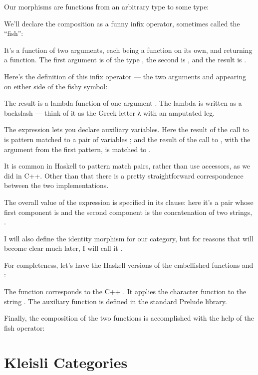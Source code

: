 Our morphisms are functions from an arbitrary type to some
 type:

We'll declare the composition as a funny infix operator, sometimes
called the ``fish'':

It's a function of two arguments, each being a function on its own, and
returning a function. The first argument is of the type
, the second is
, and the result is
.

Here's the definition of this infix operator --- the two arguments
 and  appearing on either side of the fishy
symbol:

The result is a lambda function of one argument . The lambda
is written as a backslash --- think of it as the Greek letter λ with an
amputated leg.

The  expression lets you declare auxiliary variables. Here
the result of the call to  is pattern matched to a pair of
variables ; and the result of the call to ,
with the argument  from the first pattern, is matched to
.

It is common in Haskell to pattern match pairs, rather than use
accessors, as we did in C++. Other than that there is a pretty
straightforward correspondence between the two implementations.

The overall value of the  expression is specified in its
 clause: here it's a pair whose first component is 
and the second component is the concatenation of two strings,
.

I will also define the identity morphism for our category, but for
reasons that will become clear much later, I will call it
.

For completeness, let's have the Haskell versions of the embellished
functions  and :

The function  corresponds to the C++ . It
applies the character function  to the string
. The auxiliary function  is defined in the
standard Prelude library.

Finally, the composition of the two functions is accomplished with the
help of the fish operator:


\section{Kleisli Categories}

